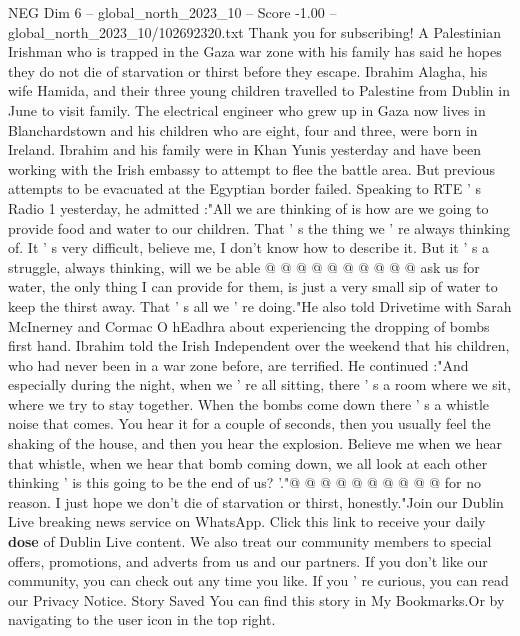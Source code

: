 \begin{textsample}{NEG Dim 6 – global\_north\_2023\_10 – Score -1.00 – global\_north\_2023\_10/102692320.txt}  \label{ex:f6_neg_198}
Thank you for subscribing!
A Palestinian Irishman who is trapped in the Gaza war zone with his family has said he hopes they do not die of starvation or thirst before they escape.
Ibrahim Alagha, his wife Hamida, and their three young children travelled to Palestine from Dublin in June to visit family.
The electrical engineer who grew up in Gaza now lives in Blanchardstown and his children who are eight, four and three, were born in Ireland.
Ibrahim and his family were in Khan Yunis yesterday and have been working with the Irish embassy to attempt to flee the battle area.
But previous attempts to be evacuated at the Egyptian border failed.
Speaking to RTE ' s Radio 1 yesterday, he admitted :"All we are thinking of is how are we going to provide food and water to our children.
That ' s the thing we ' re always thinking of.
It ' s very difficult, believe me, I don't know how to describe it.
But it ' s a struggle, always thinking, will we be able @ @ @ @ @ @ @ @ @ @ ask us for water, the only thing I can provide for them, is just a very small sip of water to keep the thirst away.
That ' s all we ' re doing."He also told Drivetime with Sarah McInerney and Cormac O hEadhra about experiencing the dropping of bombs first hand.
Ibrahim told the Irish Independent over the weekend that his children, who had never been in a war zone before, are terrified.
He continued :"And especially during the night, when we ' re all sitting, there ' s a room where we sit, where we try to stay together.
When the bombs come down there ' s a whistle noise that comes.
You hear it for a couple of seconds, then you usually feel the shaking of the house, and then you hear the explosion.
Believe me when we hear that whistle, when we hear that bomb coming down, we all look at each other thinking ' is this going to be the end of us? '."@ @ @ @ @ @ @ @ @ @ for no reason.
I just hope we don't die of starvation or thirst, honestly."Join our Dublin Live breaking news service on WhatsApp.
Click this link to receive your daily \textbf{dose} of Dublin Live content.
We also treat our community members to special offers, promotions, and adverts from us and our partners.
If you don't like our community, you can check out any time you like.
If you ' re curious, you can read our Privacy Notice.
Story Saved You can find this story in My Bookmarks.Or by navigating to the user icon in the top right.

\end{textsample}
